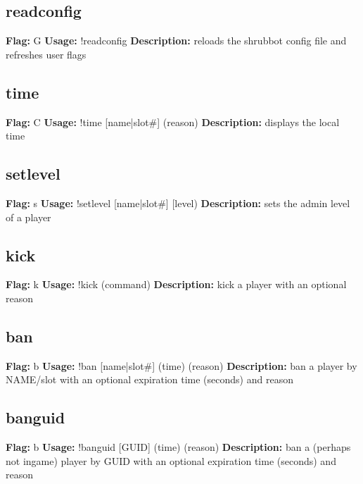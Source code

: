\subsection{readconfig}
\textbf{Flag:} \hfill G \linebreak
\textbf{Usage:} \hfill !readconfig  \linebreak
\textbf{Description:} \hfill reloads the shrubbot config file and refreshes user flags

\subsection{time}
\textbf{Flag:} \hfill C \linebreak\textbf{Usage:} \hfill !time [name|slot\#] (reason) \linebreak
\textbf{Description:} \hfill displays the local time

\subsection{setlevel}
\textbf{Flag:} \hfill s \linebreak\textbf{Usage:} \hfill !setlevel [name|slot\#] [level) \linebreak
\textbf{Description:} \hfill sets the admin level of a player
 
\subsection{kick}
\textbf{Flag:} \hfill k \linebreak\textbf{Usage:} \hfill !kick (command) \linebreak
\textbf{Description:} \hfill kick a player with an optional reason

\subsection{ban}
\textbf{Flag:} \hfill b \linebreak\textbf{Usage:} \hfill !ban [name|slot\#] (time) (reason) \linebreak
\textbf{Description:} \hfill ban a player by NAME/slot with an optional expiration time (seconds) and reason

\subsection{banguid}
\textbf{Flag:} \hfill b \linebreak\textbf{Usage:} \hfill !banguid [GUID] (time) (reason) \linebreak
\textbf{Description:} \hfill ban a (perhaps not ingame) player by GUID with an optional expiration time (seconds) and reason

